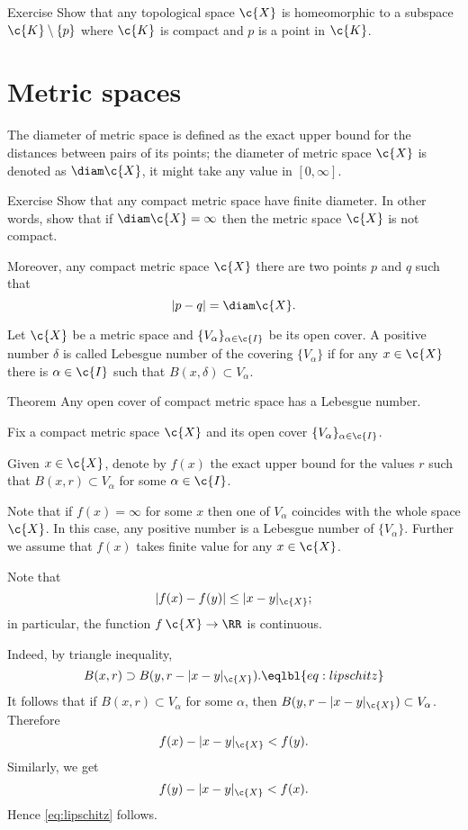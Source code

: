 \begin{thm}{Exercise}
Show that any topological space $\c{X}$ is homeomorphic to a subspace $\c{K}\setminus\{p\}$
where $\c{K}$ is compact and $p$ is a point in $\c{K}$.
\end{thm}

\section{Metric spaces}

The diameter of metric space is defined as the exact upper bound for the distances between pairs of its points;
the diameter of metric space $\c{X}$ is denoted as $\diam \c{X}$, it might take any value in $[0,\infty]$.

\begin{thm}{Exercise}
Show that any compact metric space have finite diameter.
In other words, show that if $\diam\c{X}=\infty$ then the metric space $\c{X}$ is not compact.

Moreover, any compact metric space $\c{X}$ there are two points $p$ and $q$ such that 
\[|p-q|=\diam \c{X}.\]
\end{thm}


Let $\c{X}$ be a metric space and $\{V_\alpha\}_{\alpha\in\c{I}}$ be its open cover.
A positive number $\delta$ is called Lebesgue number of the covering $\{V_\alpha\}$
if for any $x\in \c{X}$ there is $\alpha\in\c{I}$ such that $B(x,\delta)\subset V_\alpha$.

\begin{thm}{Theorem}
Any open cover of compact metric space has a Lebesgue number.
\end{thm}

Fix a compact metric space $\c{X}$ and its open cover $\{V_\alpha\}_{\alpha\in\c{I}}$.

Given $x\in \c{X}$, denote by $f(x)$ the exact upper bound for the values $r$ such that $B(x,r)\subset V_\alpha$ for some $\alpha\in \c{I}$.

Note that if $f(x)=\infty$ for some $x$ then one of $V_\alpha$ coincides with the whole space $\c{X}$.
In this case, any positive number is a Lebesgue number of $\{V_\alpha\}$.
Further we assume that $f(x)$ takes finite value for any $x\in\c{X}$.

Note that 
\[|f(x)-f(y)|\le |x-y|_{\c{X}};\]
in particular, the function $f\:\c{X}\to\RR$ is continuous.

Indeed, by triangle inequality, 
\[B(x,r)\supset B(y,r-|x-y|_{\c{X}}).\eqlbl{eq:lipschitz}\]
It follows that if $B(x,r)\subset V_\alpha$ for some $\alpha$,
then $B(y,r-|x-y|_{\c{X}})\subset V_\alpha$.
Therefore
\[f(x)-|x-y|_{\c{X}}<f(y).\]
Similarly, we get 
\[f(y)-|x-y|_{\c{X}}<f(x).\]
Hence \ref{eq:lipschitz} follows.

